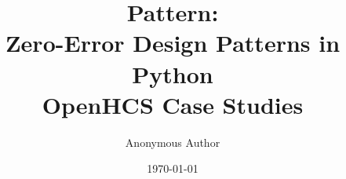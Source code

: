 \documentclass[11pt]{article}
\title{Pattern:\\Zero-Error Design Patterns in Python\\OpenHCS Case Studies}
\author{Anonymous Author}
\date{\today}
\begin{document}
\maketitle

\begin{abstract}

\end{abstract}








\end{document}
